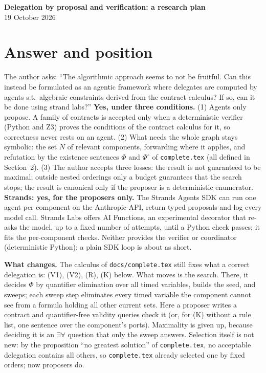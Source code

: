 \documentclass[10pt]{article}
\theoremstyle{tplain}\newtheorem{theorem}{Theorem}\newtheorem{lemma}[theorem]{Lemma}\newtheorem{proposition}[theorem]{Proposition}\newtheorem{corollary}[theorem]{Corollary}\newtheorem{claim}[theorem]{Claim}
\theoremstyle{tdef}\newtheorem{definition}[theorem]{Definition}
\begin{document}
\begin{center}{\large\bfseries Delegation by proposal and verification: a research plan}\\[1pt] 19 October 2026\end{center}

\section{Answer and position}
The author asks: ``The algorithmic approach seems to not be fruitful. Can this instead be formulated as an agentic framework where delegates are computed by agents s.t.\ algebraic constraints derived from the contract calculus? If so, can it be done using strand labs?'' \textbf{Yes, under three conditions.} (1) Agents only propose. A family of contracts is accepted only when a deterministic verifier (Python and Z3) proves the conditions of the contract calculus for it, so correctness never rests on an agent. (2) What needs the whole graph stays symbolic: the set $N$ of relevant components, forwarding where it applies, and refutation by the existence sentences $\Phi$ and $\Phi^\circ$ of \texttt{complete.tex} (all defined in Section~2). (3) The author accepts three losses: the result is not guaranteed to be maximal; outside nested orderings only a budget guarantees that the search stops; the result is canonical only if the proposer is a deterministic enumerator. \textbf{Strands: yes, for the proposers only.} The Strands Agents SDK can run one agent per component on the Anthropic API, return typed proposals and log every model call. Strands Labs offers AI Functions, an experimental decorator that re-asks the model, up to a fixed number of attempts, until a Python check passes; it fits the per-component checks. Neither provides the verifier or coordinator (deterministic Python); a plain SDK loop is about as short.

\textbf{What changes.} The calculus of \texttt{docs/complete.tex} still fixes what a correct delegation is: (V1), (V2), (R), (K) below. What moves is the search. There, it decides $\Phi$ by quantifier elimination over all timed variables, builds the seed, and sweeps; each sweep step eliminates every timed variable the component cannot see from a formula holding all other current sets. Here a proposer writes a contract and quantifier-free validity queries check it (or, for (K) without a rule list, one sentence over the component's ports). Maximality is given up, because deciding it is an $\exists\forall$ question that only the sweep answers. Selection itself is not new: by the proposition ``no greatest solution'' of \texttt{complete.tex}, no acceptable delegation contains all others, so \texttt{complete.tex} already selected one by fixed orders; now proposers do.
\end{document}
